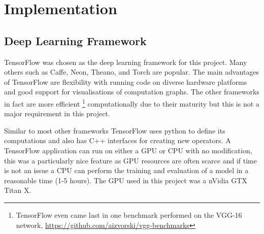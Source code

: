 \chapter{Implementation}
  \section{Deep Learning Framework}
    TensorFlow \cite{tensorflow} was chosen as the deep learning framework for this
    project. Many others such as Caffe, Neon, Theano, and Torch are popular\cite{Bahrampour2016}.
    The main advantages of TensorFlow are flexibility with running code on diverse
    hardware platforms and good support for visualisations
    of computation graphs. The other frameworks in fact are more efficient
    \footnote{TensorFlow even came last in one benchmark performed on the VGG-16 network, \url{https://github.com/aizvorski/vgg-benchmarks}}
    computationally due to their maturity\cite{Bahrampour2016}
    but this is not a major requirement in this project.


    Similar to most other frameworks TensorFlow uses python
    to define its computations and also has C++ interfaces for creating new operators.
    A TensorFlow application can run on either a GPU or CPU with no modification, this was
    a particularly nice feature as GPU resources are often scarce and if time is not an issue a CPU
    can perform the training and evaluation of a model in a reasonable time (1-5 hours). The GPU used in this project was a nVidia GTX Titan X.

